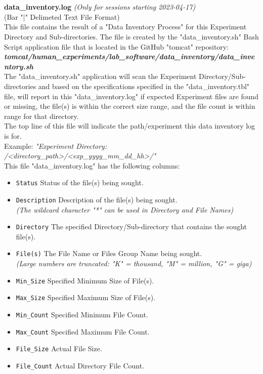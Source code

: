 \begin{description}
\textbf{\\\\}
\item
{}\label{data_inventory.log}
\textbf{data\_inventory.log} \textit{(Only for sessions starting 2023-04-17)}\\
(Bar "|" Delimeted Text File Format)\\
This file contains the result of a "Data Inventory Process" for this Experiment Directory and Sub-directories.
The file is created by the "data\_inventory.sh" Bash Script application file that is located in the GitHub "tomcat" repository:\\
\textit{\textbf{tomcat/human\_experiments/lab\_software/data\_inventory/data\_inventory.sh}}\\
The "data\_inventory.sh" application will scan the Experiment Directory/Sub-directories and based on the
specifications specified in the "data\_inventory.tbl" file,
will report in this "data\_inventory.log" if expected Experiment files are found or missing,
the file(s) is within the correct size range, and the file count is within range for that directory.\\
The top line of this file will indicate the path/experiment this data inventory log is for.\\
Example: \textit{"Experiment Directory: /<directory\_path>/<exp\_yyyy\_mm\_dd\_hh>/"}\\
This file "data\_inventory.log" has the following columns:      
\begin{itemize}
    \item \verb|Status| Status of the file(s) being sought.
    \item \verb|Description| Description of the file(s) being sought.\\
    \textit{(The wildcard character "*" can be used in Directory and File Names)}
    \item \verb|Directory| The specified Directory/Sub-directory that contains the sought file(s).
    \item \verb|File(s)| The File Name or Files Group Name being sought.\\
    \textit{(Large numbers are truncated: "K" = thousand, "M" = million, "G" = giga)}
    \item \verb|Min_Size| Specified Minimum Size of File(s).
    \item \verb|Max_Size| Specified Maximum Size of File(s).
    \item \verb|Min_Count| Specified Minimum File Count.
    \item \verb|Max_Count| Specified Maximum File Count.
    \item \verb|File_Size| Actual File Size.
    \item \verb|File_Count| Actual Directory File Count.
\end{itemize}


\end{description}
